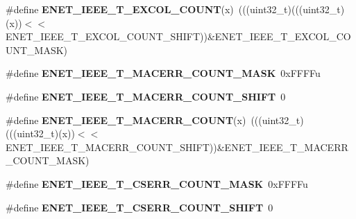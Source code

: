 \begin{DoxyCompactItemize}
\item 
\#define {\bfseries E\+N\+E\+T\+\_\+\+I\+E\+E\+E\+\_\+\+T\+\_\+\+E\+X\+C\+O\+L\+\_\+\+C\+O\+U\+NT}(x)~(((uint32\+\_\+t)(((uint32\+\_\+t)(x))$<$$<$E\+N\+E\+T\+\_\+\+I\+E\+E\+E\+\_\+\+T\+\_\+\+E\+X\+C\+O\+L\+\_\+\+C\+O\+U\+N\+T\+\_\+\+S\+H\+I\+FT))\&E\+N\+E\+T\+\_\+\+I\+E\+E\+E\+\_\+\+T\+\_\+\+E\+X\+C\+O\+L\+\_\+\+C\+O\+U\+N\+T\+\_\+\+M\+A\+SK)\hypertarget{group__ENET__Register__Masks_gaa05aef85a08b9877b13aa21b4b414443}{}\label{group__ENET__Register__Masks_gaa05aef85a08b9877b13aa21b4b414443}

\item 
\#define {\bfseries E\+N\+E\+T\+\_\+\+I\+E\+E\+E\+\_\+\+T\+\_\+\+M\+A\+C\+E\+R\+R\+\_\+\+C\+O\+U\+N\+T\+\_\+\+M\+A\+SK}~0x\+F\+F\+F\+Fu\hypertarget{group__ENET__Register__Masks_ga36adf7b60171de45b210bfdec494e6a4}{}\label{group__ENET__Register__Masks_ga36adf7b60171de45b210bfdec494e6a4}

\item 
\#define {\bfseries E\+N\+E\+T\+\_\+\+I\+E\+E\+E\+\_\+\+T\+\_\+\+M\+A\+C\+E\+R\+R\+\_\+\+C\+O\+U\+N\+T\+\_\+\+S\+H\+I\+FT}~0\hypertarget{group__ENET__Register__Masks_ga29ab60c8c05b2a4081ecdafe9cfa8b40}{}\label{group__ENET__Register__Masks_ga29ab60c8c05b2a4081ecdafe9cfa8b40}

\item 
\#define {\bfseries E\+N\+E\+T\+\_\+\+I\+E\+E\+E\+\_\+\+T\+\_\+\+M\+A\+C\+E\+R\+R\+\_\+\+C\+O\+U\+NT}(x)~(((uint32\+\_\+t)(((uint32\+\_\+t)(x))$<$$<$E\+N\+E\+T\+\_\+\+I\+E\+E\+E\+\_\+\+T\+\_\+\+M\+A\+C\+E\+R\+R\+\_\+\+C\+O\+U\+N\+T\+\_\+\+S\+H\+I\+FT))\&E\+N\+E\+T\+\_\+\+I\+E\+E\+E\+\_\+\+T\+\_\+\+M\+A\+C\+E\+R\+R\+\_\+\+C\+O\+U\+N\+T\+\_\+\+M\+A\+SK)\hypertarget{group__ENET__Register__Masks_ga712a08e94df6987bb200e27b72044213}{}\label{group__ENET__Register__Masks_ga712a08e94df6987bb200e27b72044213}

\item 
\#define {\bfseries E\+N\+E\+T\+\_\+\+I\+E\+E\+E\+\_\+\+T\+\_\+\+C\+S\+E\+R\+R\+\_\+\+C\+O\+U\+N\+T\+\_\+\+M\+A\+SK}~0x\+F\+F\+F\+Fu\hypertarget{group__ENET__Register__Masks_gaa0672cfe66f04b84789c73a1eeb66ade}{}\label{group__ENET__Register__Masks_gaa0672cfe66f04b84789c73a1eeb66ade}

\item 
\#define {\bfseries E\+N\+E\+T\+\_\+\+I\+E\+E\+E\+\_\+\+T\+\_\+\+C\+S\+E\+R\+R\+\_\+\+C\+O\+U\+N\+T\+\_\+\+S\+H\+I\+FT}~0\hypertarget{group__ENET__Register__Masks_gad924e12885d92c79e4ef3ec41026f929}{}\label{group__ENET__Register__Masks_gad924e12885d92c79e4ef3ec41026f929}


\end{DoxyCompactItemize}
